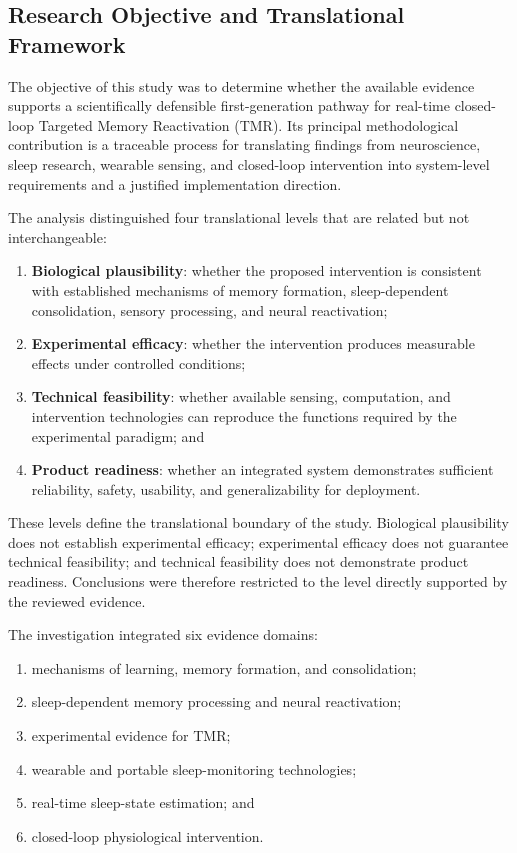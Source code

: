 \subsection{Research Objective and Translational Framework}

The objective of this study was to determine whether the available evidence
supports a scientifically defensible first-generation pathway for real-time
closed-loop Targeted Memory Reactivation (TMR). Its principal methodological
contribution is a traceable process for translating findings from neuroscience,
sleep research, wearable sensing, and closed-loop intervention into
system-level requirements and a justified implementation direction.

The analysis distinguished four translational levels that are related but not
interchangeable:

\begin{enumerate}
    \item \textbf{Biological plausibility}: whether the proposed intervention is
    consistent with established mechanisms of memory formation, sleep-dependent
    consolidation, sensory processing, and neural reactivation;

    \item \textbf{Experimental efficacy}: whether the intervention produces
    measurable effects under controlled conditions;

    \item \textbf{Technical feasibility}: whether available sensing,
    computation, and intervention technologies can reproduce the functions
    required by the experimental paradigm; and

    \item \textbf{Product readiness}: whether an integrated system demonstrates
    sufficient reliability, safety, usability, and generalizability for
    deployment.
\end{enumerate}

These levels define the translational boundary of the study. Biological
plausibility does not establish experimental efficacy; experimental efficacy
does not guarantee technical feasibility; and technical feasibility does not
demonstrate product readiness. Conclusions were therefore restricted to the
level directly supported by the reviewed evidence.

The investigation integrated six evidence domains:

\begin{enumerate}
    \item mechanisms of learning, memory formation, and consolidation;
    \item sleep-dependent memory processing and neural reactivation;
    \item experimental evidence for TMR;
    \item wearable and portable sleep-monitoring technologies;
    \item real-time sleep-state estimation; and
    \item closed-loop physiological intervention.
\end{enumerate}

